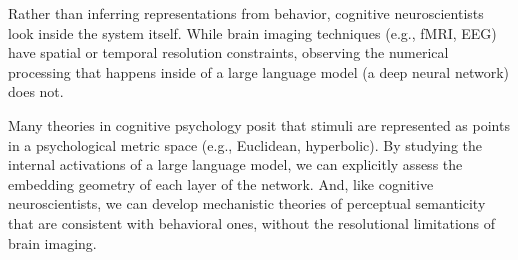 \documentclass[man]{apa7}
\begin{document}
Rather than inferring representations from behavior, cognitive neuroscientists look inside the system itself. While brain imaging techniques (e.g., fMRI, EEG) have spatial or temporal resolution constraints, observing the numerical processing that happens inside of a large language model (a deep neural network) does not.

Many theories in cognitive psychology posit that stimuli are represented as points in a psychological metric space (e.g., Euclidean, hyperbolic). By studying the internal activations of a large language model, we can explicitly assess the embedding geometry of each layer of the network. And, like cognitive neuroscientists, we can develop mechanistic theories of perceptual semanticity that are consistent with behavioral ones, without the resolutional limitations of brain imaging.

\printbibliography
\end{document}
